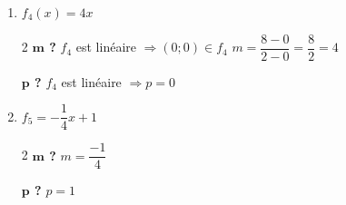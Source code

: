 \begin{enumerate}
\begin{multicols}{2}
                  \textbf{$\bm{p}$ ?}
                  \medbreak
                  $\begin{aligned}[t]
                          \text{La racine est }-5\Rightarrow 0 & = -2\cdot (-5) + p \\
                          p                                    & = -10
                      \end{aligned}$
              \end{multicols}
        \item $f_4(x) = 4x$
              \begin{multicols}{2}
                  \textbf{$\bm{m}$ ?}
                  \medbreak
                  $f_4$ est linéaire $\Rightarrow (0;0) \in f_4$
                  \medbreak
                  $m = \dfrac{8-0}{2-0} = \dfrac{8}{2} = 4$
                  \columnbreak

                  \textbf{$\bm{p}$ ?}
                  \medbreak
                  $f_4$ est linéaire $\Rightarrow p=0$
              \end{multicols}
        \item $f_5 = -\dfrac{1}{4}x + 1 $
              \begin{multicols}{2}
                  \textbf{$\bm{m}$ ?}
                  \medbreak
                  $m=\dfrac{-1}{4}$
                  \columnbreak

                  \textbf{$\bm{p}$ ?}
                  \medbreak
                  $p=1$
              \end{multicols}
    \end{enumerate}
    \newpage
